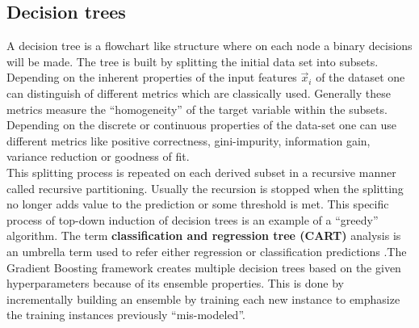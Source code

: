 \documentclass[12pt, a4paper]{article}
\begin{document}
\subsection{Decision trees}
A decision tree is a flowchart like structure where on each node a binary decisions will be made. The tree is built by splitting the initial data set into subsets. \\
Depending on the inherent properties of the input features $\vec{x}_i$ of the dataset one can distinguish of different metrics which are classically used. Generally these metrics measure the ``homogeneity'' of the target variable within the subsets. Depending on the discrete or continuous properties of the data-set one can use different metrics like positive correctness, gini-impurity, information gain, variance reduction or goodness of fit. \\
This splitting process is repeated on each derived subset in a recursive manner called recursive partitioning. Usually the recursion is stopped when the splitting no longer adds value to the prediction or some threshold is met. This specific process of top-down induction of decision trees is an example of a ``greedy'' algorithm. The term \textbf{classification and regression tree (CART)} analysis is an umbrella term used to refer either regression or classification predictions \cite{Steinberg2009}.The Gradient Boosting framework creates multiple decision trees based on the given hyperparameters because of its ensemble properties. This is done by incrementally building an ensemble by training each new instance to emphasize the training instances previously ``mis-modeled''.
\end{document}
